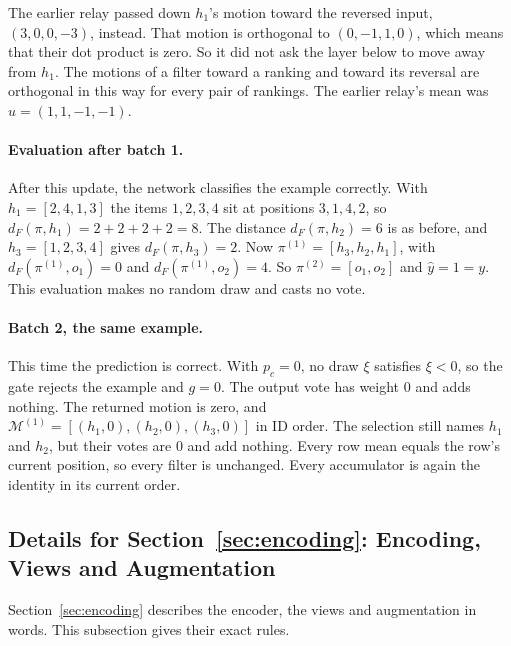 The earlier relay passed down $h_1$'s motion toward the reversed input, $(3,0,0,-3)$, instead. That motion is orthogonal to $(0,-1,1,0)$, which means that their dot product is zero. So it did not ask the layer below to move away from $h_1$. The motions of a filter toward a ranking and toward its reversal are orthogonal in this way for every pair of rankings. The earlier relay's mean was $u=(1,1,-1,-1)$.

\paragraph{Evaluation after batch 1.} After this update, the network classifies the example correctly. With $h_1=[2,4,1,3]$ the items $1,2,3,4$ sit at positions $3,1,4,2$, so $d_F(\pi,h_1)=2+2+2+2=8$. The distance $d_F(\pi,h_2)=6$ is as before, and $h_3=[1,2,3,4]$ gives $d_F(\pi,h_3)=2$. Now $\pi^{(1)}=[h_3,h_2,h_1]$, with $d_F(\pi^{(1)},o_1)=0$ and $d_F(\pi^{(1)},o_2)=4$. So $\pi^{(2)}=[o_1,o_2]$ and $\hat y=1=y$. This evaluation makes no random draw and casts no vote.

\paragraph{Batch 2, the same example.} This time the prediction is correct. With $p_c=0$, no draw $\xi$ satisfies $\xi<0$, so the gate rejects the example and $g=0$. The output vote has weight $0$ and adds nothing. The returned motion is zero, and $\mathcal{M}^{(1)}=[(h_1,0),(h_2,0),(h_3,0)]$ in ID order. The selection still names $h_1$ and $h_2$, but their votes are $0$ and add nothing. Every row mean equals the row's current position, so every filter is unchanged. Every accumulator is again the identity in its current order.

\subsection{Details for Section~\ref*{sec:encoding}: Encoding, Views and Augmentation}\label{supp:encoder}

Section~\ref{sec:encoding} describes the encoder, the views and augmentation in words. This subsection gives their exact rules.

